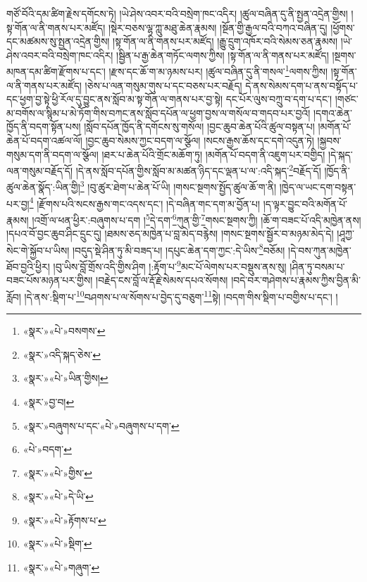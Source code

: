གཙོ་བོའི་དམ་ཚིག་རྗེས་དགོངས་ཏེ། །ཡེ་ཤེས་འབར་བའི་བསྲེག་ཁང་འདིར། །ཚུལ་བཞིན་དུ་ནི་སྤྱན་འདྲེན་གྱིས། །སྟ་གོན་ལ་ནི་གནས་པར་མཛོད། །སྡེར་བཅས་ལྷ་ཀླུ་མཐུ་ཆེན་རྣམས། །སྔོན་གྱི་རྒྱལ་བའི་བཀའ་བཞིན་དུ། །ཕྱོགས་དང་མཚམས་སུ་སྤྱན་འདྲེན་གྱིས། །སྟ་གོན་ལ་ནི་གནས་པར་མཛོད། །རྒྱུ་དྲུག་འཁོར་བའི་སེམས་ཅན་རྣམས། །ཡེ་ཤེས་འབར་བའི་བསྲེག་ཁང་འདིར། །སྦྱིན་པ་རྒྱ་ཆེན་གཏོང་ལགས་ཀྱིས། །སྟ་གོན་ལ་ནི་གནས་པར་མཛོད། །སྔགས་མཁན་དམ་ཚིག་རྫོགས་པ་དང་། །རྫས་དང་ཆོ་ག་མ་ཉམས་པར། །ཚུལ་བཞིན་དུ་ནི་གསལ་\footnote{«སྣར་»«པེ་»བསགས་}ལགས་ཀྱིས། །སྟ་གོན་ལ་ནི་གནས་པར་མཛོད། །ཅེས་པ་ལན་གསུམ་གུས་པ་དང་བཅས་པར་བརྗོད། དེ་ནས་སེམས་དག་པ་ནས་བསྟོད་པ་དང་ཕྱག་བྱ་སྟེ་ཕྱི་རོལ་དུ་བྱུང་ནས་སློབ་མ་སྟ་གོན་ལ་གནས་པར་བྱ་སྟེ། དང་པོར་ལུས་བཀྲུ་བ་དག་པ་དང་། །གཙང་མ་བགོས་ལ་སྙིམ་པ་མེ་ཏོག་གིས་བཀང་ནས་སློབ་དཔོན་ལ་ཕྱག་བྱས་ལ་གསོལ་བ་གདབ་པར་བྱའོ། །དགའ་ཆེན་ཁྱོད་ནི་བདག་སྟོན་པས། །སློབ་དཔོན་ཁྱོད་ནི་དགོངས་སུ་གསོལ། །བྱང་ཆུབ་ཆེན་པོའི་ཚུལ་བསྟན་པ། །མགོན་པོ་ཆེན་པོ་བདག་འཚལ་ལོ། །བྱང་ཆུབ་སེམས་ཀྱང་བདག་ལ་སྩོལ། །སངས་རྒྱས་ཆོས་དང་དགེ་འདུན་ཏེ། །སྐྱབས་གསུམ་དག་ནི་བདག་ལ་སྩོལ། །ཐར་པ་ཆེན་པོའི་གྲོང་མཆོག་ཏུ། །མགོན་པོ་བདག་ནི་འཇུག་པར་བགྱིད། །དེ་སྐད་ལན་གསུམ་བརྗོད་དོ། །དེ་ནས་སློབ་དཔོན་གྱིས་སློབ་མ་མཚན་ཉིད་དང་ལྡན་པ་ལ་:འདི་སྐད་\footnote{«སྣར་»འདི་སྐད་ཅེས་}བརྗོད་དོ། །ཁྱོད་ནི་ཚུལ་ཆེན་སྣོད་:ཡིན་གྱི།\footnote{«སྣར་»«པེ་»ཡིན་གྱིས།} །བུ་ཚུར་ཐེག་པ་ཆེན་པོ་ཡི། །གསང་སྔགས་སྤྱོད་ཚུལ་ཆོ་ག་ནི། །ཁྱེད་ལ་ཡང་དག་བསྟན་པར་བྱ།\footnote{«སྣར་»བྱ་བ།} །རྫོགས་པའི་སངས་རྒྱས་གང་འདས་དང་། །དེ་བཞིན་གང་དག་མ་བྱོན་པ། །ད་ལྟར་བྱུང་བའི་མགོན་པོ་རྣམས། །འགྲོ་ལ་ཕན་ཕྱིར་:བཞུགས་པ་དག །\footnote{«སྣར་»བཞུགས་པ་དང་«པེ་»བཞུགས་པ་དག་}དེ་དག་\footnote{«པེ་»བདག་}ཀུན་གྱི་\footnote{«སྣར་»«པེ་»གྱིས་}གསང་སྔགས་ཀྱི། །ཆོ་ག་བཟང་པོ་འདི་མཁྱེན་ནས། །དཔའ་བོ་བྱང་ཆུབ་ཤིང་དྲུང་དུ། །ཐམས་ཅད་མཁྱེན་པ་བླ་མེད་བརྙེས། །གསང་སྔགས་སྦྱོར་བ་མཉམ་མེད་དེ། །ཤཱཀྱ་སེང་གེ་སྐྱོབ་པ་ཡིས། །བདུད་སྡེ་ཤིན་ཏུ་མི་བཟད་པ། །དཔུང་ཆེན་དག་ཀྱང་:དེ་ཡིས་\footnote{«སྣར་»«པེ་»དེ་ཡི་}བཅོམ། །དེ་བས་ཀུན་མཁྱེན་ཐོབ་བྱའི་ཕྱིར། །བུ་ཡིས་བློ་གྲོས་འདི་གྱིས་ཤིག །:རྟོག་པ་\footnote{«སྣར་»«པེ་»རྟོགས་པ་}མང་པོ་ལེགས་པར་བསྡུས་ནས་སུ། །ཤིན་ཏུ་བསམ་པ་བཟང་པོས་མཉན་པར་གྱིས། །བརྗེད་ངས་བློ་ལ་རྡོ་རྗེ་སེམས་དཔའ་སོགས། །བདེ་བར་གཤེགས་པ་རྣམས་ཀྱིས་བྱིན་མི་རློབ། །དེ་ནས་:སྡིག་པ་\footnote{«སྣར་»«པེ་»སྡིག་}བཤགས་པ་ལ་སོགས་པ་བྱེད་དུ་བཅུག་\footnote{«སྣར་»«པེ་»གཞུག་}སྟེ། །བདག་གིས་སྡིག་པ་བགྱིས་པ་དང་། །
